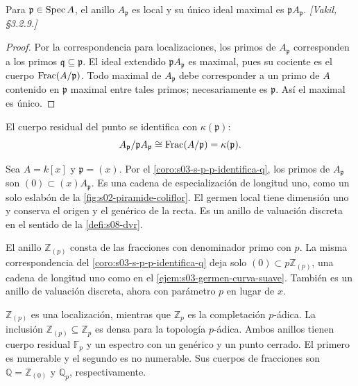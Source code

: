 \begin{prop}
\label{prop:s03-p-anillo-p-local-unico}
Para $\mathfrak p\in\operatorname{Spec} A$, el anillo $A_{\mathfrak p}$ es local y su único ideal maximal es $\mathfrak pA_{\mathfrak p}$. \emph{[Vakil, \S3.2.9.]}
\end{prop}
\begin{proof}
Por la correspondencia para localizaciones, los primos de $A_{\mathfrak p}$ corresponden a los primos $\mathfrak q\subseteq\mathfrak p$. El ideal extendido $\mathfrak pA_{\mathfrak p}$ es maximal, pues su cociente es el cuerpo $\operatorname{Frac}(A/\mathfrak p)$. Todo maximal de $A_{\mathfrak p}$ debe corresponder a un primo de $A$ contenido en $\mathfrak p$ maximal entre tales primos; necesariamente es $\mathfrak p$. Así el maximal es único.
\end{proof}

\begin{obs}
\label{obs:s03-cuerpo-residual}
El cuerpo residual del punto se identifica con $\kappa(\mathfrak p)$:
\[
A_{\mathfrak p}/\mathfrak pA_{\mathfrak p}\cong\operatorname{Frac}(A/\mathfrak p)=\kappa(\mathfrak p).
\]
\end{obs}

\begin{ejem}
\label{ejem:s03-germen-curva-suave}
Sea $A=k[x]$ y $\mathfrak p=(x)$. Por el \cref{coro:s03-s-p-p-identifica-q}, los primos de $A_{\mathfrak p}$ son $(0)\subset(x)A_{\mathfrak p}$. Es una cadena de especialización de longitud uno, como un solo eslabón de la \cref{fig:s02-piramide-coliflor}. El germen local tiene dimensión uno y conserva el origen y el genérico de la recta. Es un anillo de valuación discreta en el sentido de la \cref{defi:s08-dvr}.
\end{ejem}

\begin{ejem}
\label{ejem:s03-mismo-germen-teoria-numeros}
El anillo $\mathbb Z_{(p)}$ consta de las fracciones con denominador primo con $p$. La misma correspondencia del \cref{coro:s03-s-p-p-identifica-q} deja solo $(0)\subset p\mathbb Z_{(p)}$, una cadena de longitud uno como en el \cref{ejem:s03-germen-curva-suave}. También es un anillo de valuación discreta, ahora con parámetro $p$ en lugar de $x$.
\end{ejem}

\begin{nota}
$\mathbb Z_{(p)}$ es una localización, mientras que $\mathbb Z_p$ es la completación $p$-ádica. La inclusión $\mathbb Z_{(p)}\subseteq\mathbb Z_p$ es densa para la topología $p$-ádica. Ambos anillos tienen cuerpo residual $\mathbb F_p$ y un espectro con un genérico y un punto cerrado. El primero es numerable y el segundo es no numerable. Sus cuerpos de fracciones son $\mathbb Q=\mathbb Z_{(0)}$ y $\mathbb Q_p$, respectivamente.
\end{nota}

